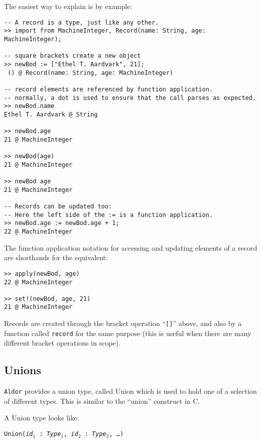 \documentclass{article}
\newcommand{\Aldor}{{\tt Aldor}}
\begin{document}
The easiest way to explain is by example:
\begin{small}
\begin{verbatim}
-- A record is a type, just like any other.
>> import from MachineInteger, Record(name: String, age: MachineInteger);

-- square brackets create a new object
>> newBod := ["Ethel T. Aardvark", 21];
 () @ Record(name: String, age: MachineInteger)

-- record elements are referenced by function application.
-- normally, a dot is used to ensure that the call parses as expected.
>> newBod.name
Ethel T. Aardvark @ String

>> newBod.age
21 @ MachineInteger

>> newBod(age)
21 @ MachineInteger

>> newBod age
21 @ MachineInteger

-- Records can be updated too:
-- Here the left side of the := is a function application.
>> newBod.age := newBod.age + 1;
22 @ MachineInteger
\end{verbatim}
\end{small}

The function application notation for accessing and updating elements
of a record are shorthands for the equivalent:
\begin{small}
\begin{verbatim}
>> apply(newBod, age)
22 @ MachineInteger

>> set!(newBod, age, 21)
21 @ MachineInteger
\end{verbatim}
\end{small}

Records are created through the bracket operation ``\verb![]!'' above,
and also by a function called {\tt record} for the same purpose (this
is useful when there are many different bracket operations in scope).

\subsection{Unions}

\Aldor{} provides a union type, called Union which is used to hold one
of a selection of different types. This is similar to the ``union''
construct in C.

A Union type looks like:
\begin{center}
{\tt Union({\it id$_1$} : {\it Type$_1$}, {\it id$_2$} : {\it Type$_2$}, \ldots)}
\end{center}
\end{document}
